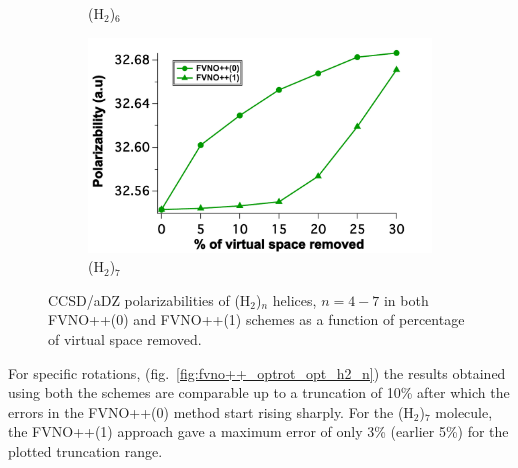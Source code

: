 \begin{figure}
\begin{subfigure}{.5\textwidth}
  \caption{(H$_2$)$_6$}
  \label{fig:sfig3}
\end{subfigure}%
\begin{subfigure}{.5\textwidth}
  \centering
  \includegraphics[width=.9\linewidth]{figures_fvno++/fvno++_cc2_1_h2_7_adz_polar.pdf}
  \caption{(H$_2$)$_7$}
  \label{fig:sfig4}
\end{subfigure}
\caption{{\footnotesize CCSD/aDZ polarizabilities of
(H$_2$)$_n$ helices, $ n = 4-7$ in both FVNO++(0) and FVNO++(1) schemes as a function of
percentage of virtual space removed.}}
\label{fig:fvno++_polar_opt_h2_n}
\end{figure}
For specific rotations, (fig.~\ref{fig:fvno++_optrot_opt_h2_n}) the results obtained using both the schemes are comparable up to a truncation of 10\% after which the errors in the FVNO++(0) method start rising sharply. For the (H$_2$)$_7$ molecule, the FVNO++(1) approach gave a maximum error of only 3\% (earlier 5\%) for the plotted truncation range.
